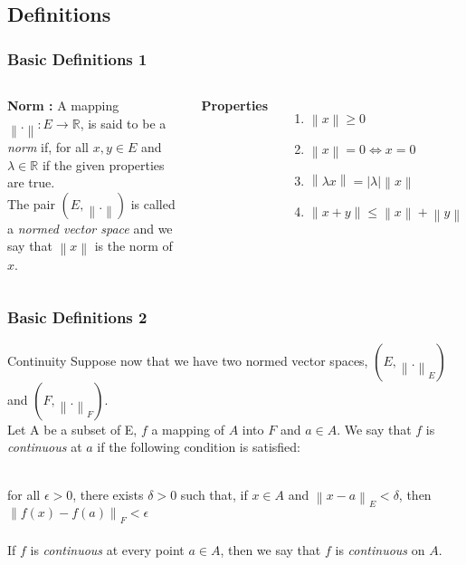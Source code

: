 \documentclass{beamer}
\newcommand\norm[1]{\left\lVert#1\right\rVert}
\begin{document}
\subsection{Definitions}
\begin{frame}
\frametitle{Basic Definitions 1}
\begin{columns}[c] %

\textbf{Norm :}
A mapping $ \norm{.}: E\rightarrow \mathbb{R} $, is said to be a \textit{norm} if, for all $x, y \in E$ and $\lambda \in \mathbb{R}$ if the given properties are true.\\ The pair $(E, \norm{.})$ is called a \textit{normed vector space} and we say that $\norm{x}$ is the norm
of $x$.

\pause

\textbf{Properties}
\begin{enumerate}
\item $\norm{x}\geq 0 $
\item $\norm{x} = 0 \Leftrightarrow x = 0$
\item $\norm{\lambda x} = |\lambda|\norm{x}$
\item $ \norm{x + y} \leq \norm{x} + \norm{y}$
\end{enumerate}

\end{columns}
\end{frame}



\begin{frame}
\frametitle{Basic Definitions 2}
\begin{block}{Continuity}
Suppose now that we have two normed vector spaces, $(E, \norm{.}_{E})$ and $(F, \norm{.}_{F})$.\\ Let A be a subset of E, $ f $ a mapping of $A$ into $F$ and $a \in A$. We say that $f$ is \textit{continuous} at $a$ if the following condition is satisfied:\\~\par
\pause
for all $\epsilon > 0$, there exists $\delta > 0$ such that, if $x \in A$ and $\norm{x-a}_{E} < \delta$,
then $\norm{f(x) - f(a)}_{F} < \epsilon$ \\~\\
If $f$ is \textit{continuous} at every point $a \in A$, then we say that $f$ is \textit{continuous} on $A$.
\end{block}
\end{frame}
\end{document}
